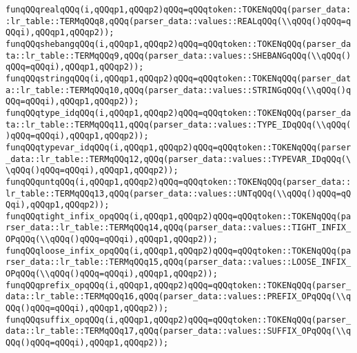 \verb|funqQQqrealqQQq(i,qQQqp1,qQQqp2)qQQq=qQQqtoken::TOKENqQQq(parser_data::lr_table::TERMqQQq8,qQQq(parser_data::values::REALqQQq(\\qQQq()qQQq=qQQqi),qQQqp1,qQQqp2));|\newline
\verb|funqQQqshebangqQQq(i,qQQqp1,qQQqp2)qQQq=qQQqtoken::TOKENqQQq(parser_data::lr_table::TERMqQQq9,qQQq(parser_data::values::SHEBANGqQQq(\\qQQq()qQQq=qQQqi),qQQqp1,qQQqp2));|\newline
\verb|funqQQqstringqQQq(i,qQQqp1,qQQqp2)qQQq=qQQqtoken::TOKENqQQq(parser_data::lr_table::TERMqQQq10,qQQq(parser_data::values::STRINGqQQq(\\qQQq()qQQq=qQQqi),qQQqp1,qQQqp2));|\newline
\verb|funqQQqtype_idqQQq(i,qQQqp1,qQQqp2)qQQq=qQQqtoken::TOKENqQQq(parser_data::lr_table::TERMqQQq11,qQQq(parser_data::values::TYPE_IDqQQq(\\qQQq()qQQq=qQQqi),qQQqp1,qQQqp2));|\newline
\verb|funqQQqtypevar_idqQQq(i,qQQqp1,qQQqp2)qQQq=qQQqtoken::TOKENqQQq(parser_data::lr_table::TERMqQQq12,qQQq(parser_data::values::TYPEVAR_IDqQQq(\\qQQq()qQQq=qQQqi),qQQqp1,qQQqp2));|\newline
\verb|funqQQquntqQQq(i,qQQqp1,qQQqp2)qQQq=qQQqtoken::TOKENqQQq(parser_data::lr_table::TERMqQQq13,qQQq(parser_data::values::UNTqQQq(\\qQQq()qQQq=qQQqi),qQQqp1,qQQqp2));|\newline
\verb|funqQQqtight_infix_opqQQq(i,qQQqp1,qQQqp2)qQQq=qQQqtoken::TOKENqQQq(parser_data::lr_table::TERMqQQq14,qQQq(parser_data::values::TIGHT_INFIX_OPqQQq(\\qQQq()qQQq=qQQqi),qQQqp1,qQQqp2));|\newline
\verb|funqQQqloose_infix_opqQQq(i,qQQqp1,qQQqp2)qQQq=qQQqtoken::TOKENqQQq(parser_data::lr_table::TERMqQQq15,qQQq(parser_data::values::LOOSE_INFIX_OPqQQq(\\qQQq()qQQq=qQQqi),qQQqp1,qQQqp2));|\newline
\verb|funqQQqprefix_opqQQq(i,qQQqp1,qQQqp2)qQQq=qQQqtoken::TOKENqQQq(parser_data::lr_table::TERMqQQq16,qQQq(parser_data::values::PREFIX_OPqQQq(\\qQQq()qQQq=qQQqi),qQQqp1,qQQqp2));|\newline
\verb|funqQQqsuffix_opqQQq(i,qQQqp1,qQQqp2)qQQq=qQQqtoken::TOKENqQQq(parser_data::lr_table::TERMqQQq17,qQQq(parser_data::values::SUFFIX_OPqQQq(\\qQQq()qQQq=qQQqi),qQQqp1,qQQqp2));|\newline
